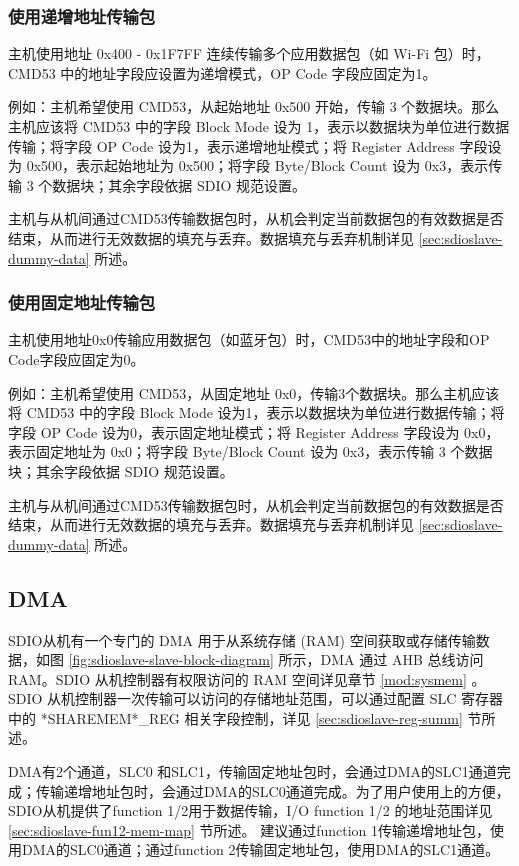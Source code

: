 \documentclass[main\_\_CN.tex]{subfiles}
\begin{document}
\subsubsection{使用递增地址传输包}

主机使用地址 0x400 - 0x1F7FF 连续传输多个应用数据包（如 Wi-Fi 包）时，CMD53 中的地址字段应设置为递增模式，OP Code 字段应固定为1。

例如：主机希望使用 CMD53，从起始地址 0x500 开始，传输 3 个数据块。那么主机应该将 CMD53 中的字段 Block Mode 设为 1，表示以数据块为单位进行数据传输；将字段 OP Code 设为1，表示递增地址模式；将 Register Address 字段设为 0x500，表示起始地址为 0x500；将字段 Byte/Block Count 设为 0x3，表示传输 3 个数据块；其余字段依据 SDIO 规范设置。

主机与从机间通过CMD53传输数据包时，从机会判定当前数据包的有效数据是否结束，从而进行无效数据的填充与丢弃。数据填充与丢弃机制详见 \ref{sec:sdioslave-dummy-data} 所述。

\subsubsection{使用固定地址传输包}

主机使用地址0x0传输应用数据包（如蓝牙包）时，CMD53中的地址字段和OP Code字段应固定为0。

例如：主机希望使用 CMD53，从固定地址 0x0，传输3个数据块。那么主机应该将 CMD53 中的字段 Block Mode 设为1，表示以数据块为单位进行数据传输；将字段 OP Code 设为0，表示固定地址模式；将 Register Address 字段设为 0x0，表示固定地址为 0x0；将字段 Byte/Block Count 设为 0x3，表示传输 3 个数据块；其余字段依据 SDIO 规范设置。

主机与从机间通过CMD53传输数据包时，从机会判定当前数据包的有效数据是否结束，从而进行无效数据的填充与丢弃。数据填充与丢弃机制详见 \ref{sec:sdioslave-dummy-data} 所述。

\subsection{DMA}
\label{sec:sdioslave-dma}

SDIO从机有一个专门的 DMA 用于从系统存储 (RAM) 空间获取或存储传输数据，如图 \ref{fig:sdioslave-slave-block-diagram} 所示，DMA 通过 AHB 总线访问 RAM。SDIO 从机控制器有权限访问的 RAM 空间详见章节 \ref{mod:sysmem} \textit{}。SDIO 从机控制器一次传输可以访问的存储地址范围，可以通过配置 SLC 寄存器中的 *SHAREMEM*\_REG 相关字段控制，详见 \ref{sec:sdioslave-reg-summ} 节所述。

DMA有2个通道，SLC0 和SLC1，传输固定地址包时，会通过DMA的SLC1通道完成；传输递增地址包时，会通过DMA的SLC0通道完成。为了用户使用上的方便，SDIO从机提供了function 1/2用于数据传输，I/O function 1/2 的地址范围详见 \ref{sec:sdioslave-fun12-mem-map} 节所述。 建议通过function 1传输递增地址包，使用DMA的SLC0通道；通过function 2传输固定地址包，使用DMA的SLC1通道。
\end{document}
